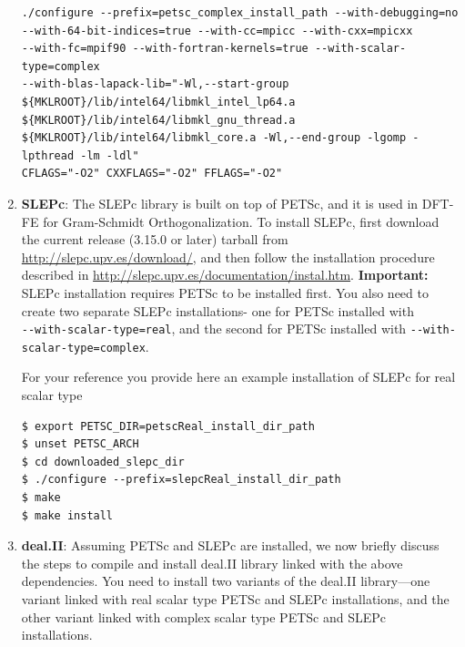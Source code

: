 \begin{enumerate}
\begin{verbatim}
./configure --prefix=petsc_complex_install_path --with-debugging=no
--with-64-bit-indices=true --with-cc=mpicc --with-cxx=mpicxx
--with-fc=mpif90 --with-fortran-kernels=true --with-scalar-type=complex
--with-blas-lapack-lib="-Wl,--start-group 
${MKLROOT}/lib/intel64/libmkl_intel_lp64.a ${MKLROOT}/lib/intel64/libmkl_gnu_thread.a
${MKLROOT}/lib/intel64/libmkl_core.a -Wl,--end-group -lgomp -lpthread -lm -ldl"
CFLAGS="-O2" CXXFLAGS="-O2" FFLAGS="-O2"
\end{verbatim}

\item {\bf SLEPc}: The SLEPc library is built on top of PETSc, and it is used in DFT-FE for Gram-Schmidt Orthogonalization. To install SLEPc, first download the current release (3.15.0 or later) tarball from \url{http://slepc.upv.es/download/}, and then follow the installation procedure described in \url{http://slepc.upv.es/documentation/instal.htm}. {\bf Important: } SLEPc installation requires PETSc to be installed first. You also need to create two separate SLEPc installations- one for PETSc installed with \\\verb|--with-scalar-type=real|, and the second for PETSc installed with \verb|--with-scalar-type=complex|. 
	
For your reference you provide here an example installation of SLEPc for real scalar type
\begin{verbatim}
$ export PETSC_DIR=petscReal_install_dir_path
$ unset PETSC_ARCH
$ cd downloaded_slepc_dir
$ ./configure --prefix=slepcReal_install_dir_path
$ make
$ make install
\end{verbatim}


\item {\bf deal.II}: Assuming PETSc and SLEPc are installed, we now briefly discuss the steps to compile and install deal.II library linked with the above dependencies. You need to install two variants of the deal.II library---one variant linked with real scalar type PETSc and SLEPc installations, and the other variant linked with complex scalar type PETSc and SLEPc installations. 


\end{enumerate}
